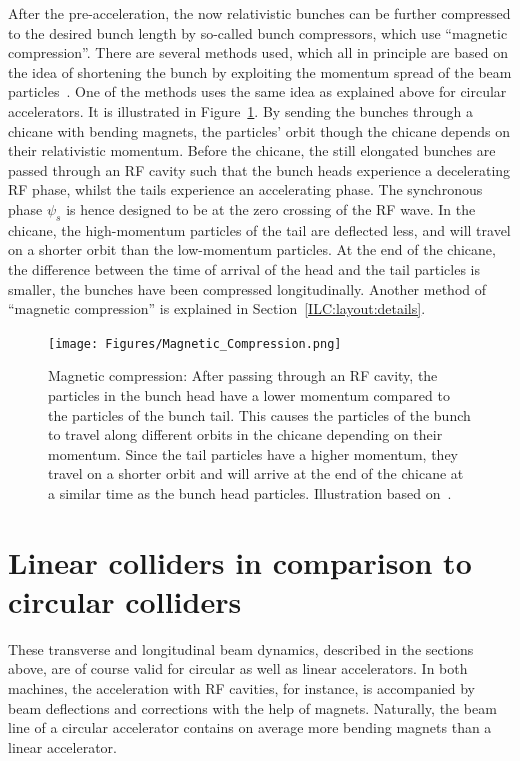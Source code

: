 After the pre-acceleration, the now relativistic bunches can be further compressed to the desired bunch length by so-called bunch compressors, which use ``magnetic compression''.
There are several methods used, which all in principle are based on the idea of shortening the bunch by exploiting the momentum spread of the beam particles~\cite[cf. p. 378ff]{Wiedemann}.
One of the methods uses the same idea as explained above for circular accelerators.
It is illustrated in Figure~\ref{fig:Magnetic_compression}.
By sending the bunches through a chicane with bending magnets, the particles' orbit though the chicane depends on their relativistic momentum.
Before the chicane, the still elongated bunches are passed through an RF cavity such that the bunch heads experience a decelerating RF phase, whilst the tails experience an accelerating phase.
The synchronous phase $\psi_s$ is hence designed to be at the zero crossing of the RF wave.
In the chicane, the high-momentum particles of the tail are deflected less, and will travel on a shorter orbit than the low-momentum particles.
At the end of the chicane, the difference between the time of arrival of the head and the tail particles is smaller, the bunches have been compressed longitudinally.
Another method of ``magnetic compression'' is explained in Section~\ref{ILC:layout:details}.
\begin{figure}[h]
\centering
\texttt{[image: Figures/Magnetic\_Compression.png]}
\caption[Magnetic compression]{Magnetic compression: After passing through an RF cavity, the particles in the bunch head have a lower momentum compared to the particles of the bunch tail.
This causes the particles of the bunch to travel along different orbits in the chicane depending on their momentum.
Since the tail particles have a higher momentum, they travel on a shorter orbit and will arrive at the end of the chicane at a similar time as the bunch head particles.
Illustration based on~\cite[p. 75]{Bunching}.}
\label{fig:Magnetic_compression}
\end{figure}

\section{Linear colliders in comparison to circular colliders}
\label{AccPhysics:Linear-Circular}
These transverse and longitudinal beam dynamics, described in the sections above, are of course valid for circular as well as linear accelerators.
In both machines, the acceleration with RF cavities, for instance, is accompanied by beam deflections and corrections with the help of magnets.
Naturally, the beam line of a circular accelerator contains on average more bending magnets than a linear accelerator.

